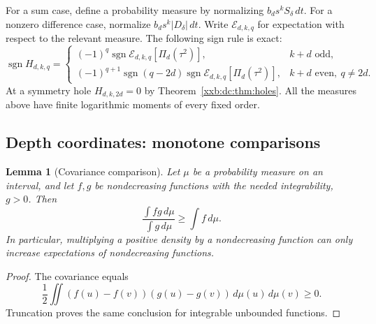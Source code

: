 \documentclass[11pt,a4paper]{article}
\numberwithin{equation}{section}
\newtheorem{lemma}[theorem]{Lemma}
\theoremstyle{definition}
\theoremstyle{remark}
\theoremstyle{plain}
\DeclareMathOperator{\sgn}{sgn}
\begin{document}
For a sum case, define a probability measure by normalizing
$b_ds^kS_\delta\,dt$.  For a nonzero difference case, normalize
$b_ds^k|D_\delta|\,dt$.  Write $\mathcal E_{d,k,q}$ for expectation with
respect to the relevant measure.  The following sign rule is exact:
\begin{equation}\label{xxb:dc:eq:sign-rule}
 \sgn H_{d,k,q}=
 \begin{cases}
 (-1)^q\sgn\mathcal E_{d,k,q}[\Pi_d(\tau^2)],&k+d\text{ odd},\\
 (-1)^{q+1}\sgn(q-2d)\sgn\mathcal E_{d,k,q}[\Pi_d(\tau^2)],
      &k+d\text{ even},\ q\ne2d.
 \end{cases}
\end{equation}
At a symmetry hole $H_{d,k,2d}=0$ by Theorem~\ref{xxb:dc:thm:holes}.
All the measures above have finite logarithmic moments of every fixed
order.

\subsection{Depth coordinates: monotone comparisons}\label{xxb:dc:sec:monotone}

\begin{lemma}[Covariance comparison]\label{xxb:dc:lem:covariance}
Let $\mu$ be a probability measure on an interval, and let $f,g$ be
nondecreasing functions with the needed integrability, $g>0$.  Then
\[
 \frac{\int fg\,d\mu}{\int g\,d\mu}\ge\int f\,d\mu.
\]
In particular, multiplying a positive density by a nondecreasing function
can only increase expectations of nondecreasing functions.
\end{lemma}
\begin{proof}
The covariance equals
\[
 \frac12\iint(f(u)-f(v))(g(u)-g(v))\,d\mu(u)\,d\mu(v)\ge0.
\]
Truncation proves the same conclusion for integrable unbounded functions.
\end{proof}
\end{document}
